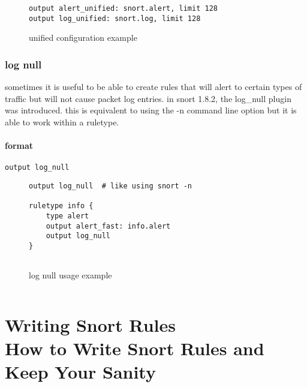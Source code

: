 \documentclass[english]{report}
\begin{document}
\begin{figure}[!hbpt]
\begin{verbatim}
output alert_unified: snort.alert, limit 128
output log_unified: snort.log, limit 128
\end{verbatim}
\caption{unified configuration example\label{unified example}}
\end{figure}

\subsection{log null}

sometimes it is useful to be able to create rules that will alert
to certain types of traffic but will not cause packet log entries.
in snort 1.8.2, the log\_null plugin was introduced. this is equivalent
to using the -n command line option but it is able to work within
a ruletype.


\subsubsection{format}

\begin{verbatim}
output log_null
\end{verbatim}
%
\begin{figure}[!hbpt]
\begin{verbatim}
output log_null  # like using snort -n

ruletype info {
    type alert
    output alert_fast: info.alert
    output log_null
}


\end{verbatim}

\caption{log null usage example\label{log null usage example}}
\end{figure}


\begin{verbatim}

\end{verbatim}





\newpage
\chapter{Writing Snort Rules\protect \\
How to Write Snort Rules and Keep Your Sanity\label{Writing Snort Rules}}
\end{document}

